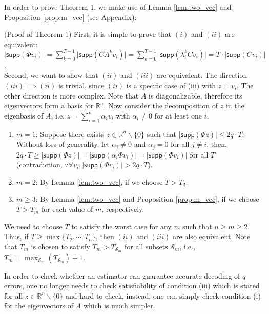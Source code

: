\documentclass[twocolumn]{autart}    %
\newcommand{\rev}[1]{{\normalsize{{{\color{blue}#1}}}}}
\begin{document}
\vspace{-0.4cm}
In order to prove Theorem 1, we make use of Lemma \ref{lem:two_vec} and Proposition \ref{prop:m_vec} (see Appendix): 
\vspace{-0.6cm}
\begin{pf} (Proof of Theorem 1)
First, it is simple to prove that $(i)$ and $(ii)$ are equivalent: $\lvert \textsf{supp} (\Phi v_i) \rvert = \sum_{k=0}^{T-1} \lvert \textsf{supp} (CA^k v_i ) \rvert = \sum_{k=0}^{T-1} \lvert  \textsf{supp} (\lambda_i^k C v_i )\rvert  = T\cdot  \lvert \textsf{supp} (C v_i) \rvert  $. \\
Second, we want to show that $(ii)$ and $(iii)$ are equivalent. The direction $(iii) \implies (ii)$ is trivial, since $(ii)$ is a specific case of (iii) with $z = v_i$. The other direction is more complex. Note that $A$ is diagonalizable, therefore its eigenvectors form a basis for $\mathbb{R}^n$. Now consider the decomposition of $z $ in the eigenbasis of $A$, i.e. $z = \sum_{i=1}^n \alpha_i v_i$ with $\alpha_i \neq 0$ for at least one $i$. 
\begin{enumerate}
\item $m=1$: Suppose there exists $z \in \mathbb{R}^n \backslash \{ 0\}$ such that $ \lvert \textsf{supp} (\Phi z) \rvert \le 2 q \cdot T$. Without loss of generality, let $\alpha_i \neq 0$ and $\alpha_j= 0$ for all $j \neq i$, then, $2 q \cdot T \ge \lvert \textsf{supp} (\Phi z) \rvert = \lvert \textsf{supp} (\alpha_i \Phi v_i) \rvert = \lvert \textsf{supp} (\Phi v_i) \rvert $ for all $T$ (contradiction, $\because \forall v_i, \lvert \textsf{supp} (\Phi v_i) \rvert  > 2 q \cdot T$). 
\item $m=2$: By Lemma \ref{lem:two_vec}, if we choose $T>T_2$.
\item $m\ge 3$: By Lemma \ref{lem:two_vec} and Proposition \ref{prop:m_vec}, if we choose $T>T_m$ for each value of $m$, respectively.
\end{enumerate}
We need to choose $T$ to satisfy the worst case for any $m$ such that $n \ge m \ge 2$. Thus, if $T \ge \max \{ T_2, \cdots, T_n \}$, then $(ii)$ and $(iii)$ are also equivalent. \rev{Note that $T_m$ is chosen \rev{to satisfy} $T_m > T_{\mathcal{S}_m}$ for all subsets $\mathcal{S}_m$, \rev{i.e., $T_m = \max_{\mathcal{S}_m}( T_{\mathcal{S}_m})+1$.}}%
\end{pf}
\vspace{-0.6cm}
\rev{In order to check whether an estimator can guarantee accurate decoding of $q$ errors, one no longer needs to check satisfiability of condition (iii) which is stated for all $z \in \mathbb{R}^n\backslash \{0 \}$ and hard to check, instead, one can simply check condition (i) for the eigenvectors of $A$ which is much simpler.
}
\end{document}
